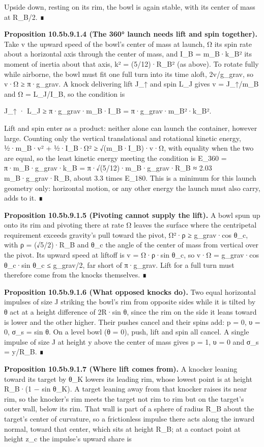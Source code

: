 \documentclass[
]{article}
\begin{document}
Upside down, resting on its rim, the bowl is again stable, with its
center of mass at R\_B/2. ∎

\textbf{Proposition 10.5b.9.1.4 (The 360° launch needs lift and spin
together).} Take v the upward speed of the bowl's center of mass at
launch, Ω its spin rate about a horizontal axis through the center of
mass, and I\_B = m\_B·k\_B² its moment of inertia about that axis, k² =
(5/12)·R\_B² (as above). To rotate fully while airborne, the bowl must
fit one full turn into its time aloft, 2v/g\_grav, so v·Ω ≥ π·g\_grav. A
knock delivering lift J\_↑ and spin L\_J gives v = J\_↑/m\_B and Ω =
L\_J/I\_B, so the condition is

J\_↑ · L\_J ≥ π·g\_grav·m\_B·I\_B = π·g\_grav·m\_B²·k\_B².

Lift and spin enter as a product: neither alone can launch the
container, however large. Counting only the vertical translational and
rotational kinetic energy, ½·m\_B·v² + ½·I\_B·Ω² ≥ √(m\_B·I\_B)·v·Ω,
with equality when the two are equal, so the least kinetic energy
meeting the condition is E\_360 = π·m\_B·g\_grav·k\_B =
π·√(5/12)·m\_B·g\_grav·R\_B ≈ 2.03 m\_B·g\_grav·R\_B, about 3.3 times
E\_180. This is a minimum for this launch geometry only: horizontal
motion, or any other energy the launch must also carry, adds to it. ∎

\textbf{Proposition 10.5b.9.1.5 (Pivoting cannot supply the lift).} A
bowl spun up onto its rim and pivoting there at rate Ω leaves the
surface where the centripetal requirement exceeds gravity's pull toward
the pivot, Ω²·ρ ≥ g\_grav·cos θ\_c, with ρ = (√5/2)·R\_B and θ\_c the
angle of the center of mass from vertical over the pivot. Its upward
speed at liftoff is v = Ω·ρ·sin θ\_c, so v·Ω = g\_grav·cos θ\_c·sin θ\_c
≤ g\_grav/2, far short of π·g\_grav. Lift for a full turn must therefore
come from the knocks themselves. ∎

\textbf{Proposition 10.5b.9.1.6 (What opposed knocks do).} Two equal
horizontal impulses of size J striking the bowl's rim from opposite
sides while it is tilted by θ act at a height difference of 2R·sin θ,
since the rim on the side it leans toward is lower and the other higher.
Their pushes cancel and their spins add: p = 0, υ = 0, σ\_s = sin θ. On
a level bowl (θ = 0), push, lift and spin all cancel. A single impulse
of size J at height y above the center of mass gives p = 1, υ = 0 and
σ\_s = y/R\_B. ∎

\textbf{Proposition 10.5b.9.1.7 (Where lift comes from).} A knocker
leaning toward its target by θ\_K lowers its leading rim, whose lowest
point is at height R\_B·(1 − sin θ\_K). A target leaning away from that
knocker raises its near rim, so the knocker's rim meets the target not
rim to rim but on the target's outer wall, below its rim. That wall is
part of a sphere of radius R\_B about the target's center of curvature,
so a frictionless impulse there acts along the inward normal, toward
that center, which sits at height R\_B; at a contact point at height
z\_c the impulse's upward share is
\end{document}
